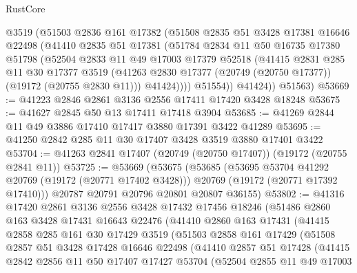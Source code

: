 \begin{lexlean}{RustCore}
\begin{coremodule}
          @3519
          (@51503
            @2836
            @161
            @17382
            (@51508
              @2835
              @51
              @3428
              @17381
              @16646
              @22498
              (@41410
                @2835
                @51
                @17381
                (@51784
                  @2834
                  @11
                  @50
                  @16735
                  @17380
                  @51798
                  (@52504
                    @2833
                    @11
                    @49
                    @17003
                    @17379
                    @52518
                    (@41415
                      @2831
                      @285
                      @11
                      @30
                      @17377
                      @3519
                      (@41263 @2830 @17377 (@20749 (@20750 @17377)) (@19172 (@20755 @2830 @11)))
                      @41424))))
              @51554))
          @41424))
      @51563)
@53669 := @41223 @2846 @2861 @3136 @2556 @17411 @17420 @3428 @18248
@53675 := @41627 @2845 @50 @13 @17411 @17418 @3904
@53685 := @41269 @2844 @11 @49 @3886 @17410 @17417 @3880 @17391 @3422 @41289
@53695 := @41250 @2842 @285 @11 @30 @17407 @3428 @3519 @3880 @17401 @3422
@53704 := @41263 @2841 @17407 (@20749 (@20750 @17407)) (@19172 (@20755 @2841 @11))
@53725 := @53669
    (@53675
      (@53685
        (@53695 @53704 @41292 @20769 (@19172 (@20771 @17402 @3428)))
        @20769
        (@19172 (@20771 @17392 @17410)))
      @20787
      @20791
      @20796
      @20801
      @20807
      @36155)
@53802 := @41316
    @17420
    @2861
    @3136
    @2556
    @3428
    @17432
    @17456
    @18246
    (@51486
      @2860
      @163
      @3428
      @17431
      @16643
      @22476
      (@41410
        @2860
        @163
        @17431
        (@41415
          @2858
          @285
          @161
          @30
          @17429
          @3519
          (@51503
            @2858
            @161
            @17429
            (@51508
              @2857
              @51
              @3428
              @17428
              @16646
              @22498
              (@41410
                @2857
                @51
                @17428
                (@41415
                  @2842
                  @2856
                  @11
                  @50
                  @17407
                  @17427
                  @53704
                  (@52504
                    @2855
                    @11
                    @49
                    @17003

\end{coremodule}
\end{lexlean}
